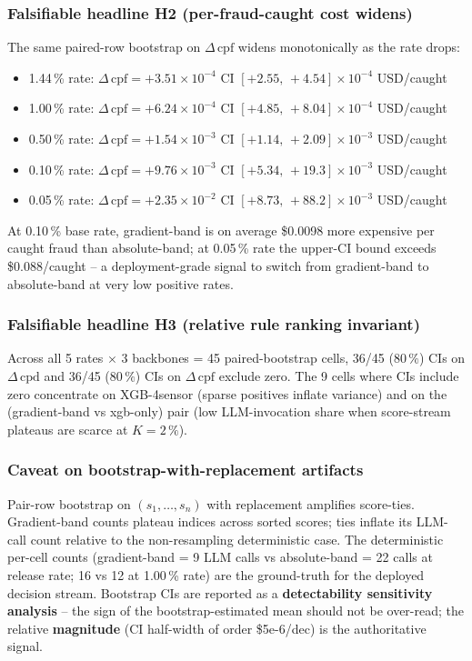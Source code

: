 \documentclass{article}
\begin{document}
\subsubsection{Falsifiable headline H2 (per-fraud-caught cost widens)}
The same paired-row bootstrap on $\Delta\,\mathrm{cpf}$ widens
monotonically as the rate drops:
\begin{itemize}
  \item 1.44\,\% rate: $\Delta\,\mathrm{cpf}=+3.51{\times}10^{-4}$
        CI $[+2.55,\,+4.54]{\times}10^{-4}$ USD/caught
  \item 1.00\,\% rate: $\Delta\,\mathrm{cpf}=+6.24{\times}10^{-4}$
        CI $[+4.85,\,+8.04]{\times}10^{-4}$ USD/caught
  \item 0.50\,\% rate: $\Delta\,\mathrm{cpf}=+1.54{\times}10^{-3}$
        CI $[+1.14,\,+2.09]{\times}10^{-3}$ USD/caught
  \item 0.10\,\% rate: $\Delta\,\mathrm{cpf}=+9.76{\times}10^{-3}$
        CI $[+5.34,\,+19.3]{\times}10^{-3}$ USD/caught
  \item 0.05\,\% rate: $\Delta\,\mathrm{cpf}=+2.35{\times}10^{-2}$
        CI $[+8.73,\,+88.2]{\times}10^{-3}$ USD/caught
\end{itemize}
At 0.10\,\% base rate, gradient-band is on average \$0.0098 more
expensive per caught fraud than absolute-band; at 0.05\,\% rate the
upper-CI bound exceeds \$0.088/caught -- a deployment-grade
signal to switch from gradient-band to absolute-band at very low
positive rates.

\subsubsection{Falsifiable headline H3 (relative rule ranking invariant)}
Across all 5 rates $\times$ 3 backbones = 45 paired-bootstrap
cells, 36/45 ($80\,\%$) CIs on $\Delta\,\mathrm{cpd}$ and 36/45
($80\,\%$) CIs on $\Delta\,\mathrm{cpf}$ exclude zero. The 9 cells
where CIs include zero concentrate on XGB-4sensor (sparse
positives inflate variance) and on the (gradient-band vs
xgb-only) pair (low LLM-invocation share when
score-stream plateaus are scarce at $K{=}2\,\%$).

\subsubsection{Caveat on bootstrap-with-replacement artifacts}
Pair-row bootstrap on $(s_1,\ldots,s_n)$ with replacement
amplifies score-ties. Gradient-band counts plateau indices across
sorted scores; ties inflate its LLM-call count relative to the
non-resampling deterministic case. The deterministic per-cell
counts (gradient-band = 9 LLM calls vs absolute-band = 22 calls at
release rate; 16 vs 12 at 1.00\,\% rate) are the ground-truth for
the deployed decision stream. Bootstrap CIs are reported as a
\textbf{detectability sensitivity analysis} -- the sign of the
bootstrap-estimated mean should not be over-read; the relative
\textbf{magnitude} (CI half-width of order \$5e-6/dec) is the
authoritative signal.
\end{document}

